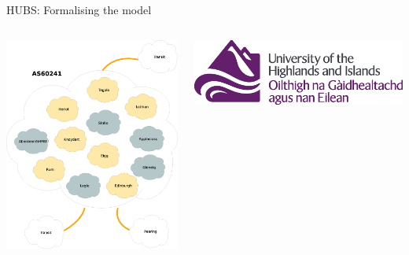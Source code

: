 \documentclass{beamer}
\begin{document}
\begin{frame}{HUBS: Formalising the model}
  \begin{columns}
    \includegraphics[width=\textwidth]{confederation.eps}\\
    \begin{center}
      \includegraphics[height=0.07\textheight]{UHI_Logo_CMYK}
      \hspace{1pt}

\end{center}
\end{columns}
\end{frame}
\end{document}
